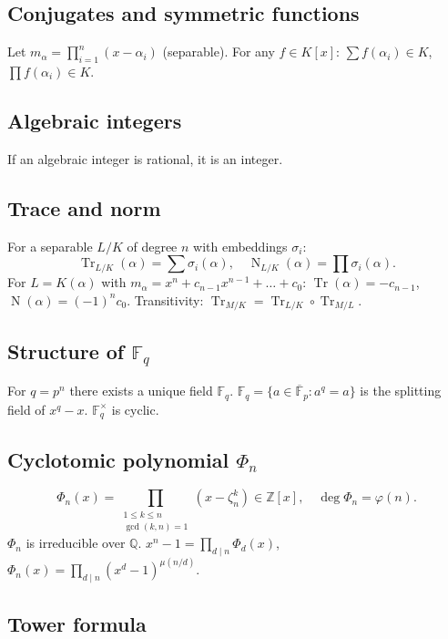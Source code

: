 \subsection{Conjugates and symmetric functions}
\label{subsec:conjugates}

Let $m_\alpha=\prod_{i=1}^n(x-\alpha_i)$ (separable). For any $f\in K[x]$: $\sum f(\alpha_i)\in K$, $\prod f(\alpha_i)\in K$.

\subsection{Algebraic integers}
\label{subsec:algebraic-integers}

If an algebraic integer is rational, it is an integer.

\subsection{Trace and norm}
\label{subsec:trace-norm}

For a separable $L/K$ of degree $n$ with embeddings $\sigma_i$:
$$\operatorname{Tr}_{L/K}(\alpha)=\sum\sigma_i(\alpha),\quad \operatorname{N}_{L/K}(\alpha)=\prod\sigma_i(\alpha).$$
For $L=K(\alpha)$ with $m_\alpha=x^n+c_{n-1}x^{n-1}+\dots+c_0$: $\operatorname{Tr}(\alpha)=-c_{n-1}$, $\operatorname{N}(\alpha)=(-1)^n c_0$.
Transitivity: $\operatorname{Tr}_{M/K}=\operatorname{Tr}_{L/K}\circ\operatorname{Tr}_{M/L}$.

\subsection{Structure of $\mathbb{F}_q$}
\label{subsec:structure-fq}

For $q=p^n$ there exists a unique field $\mathbb{F}_q$. $\mathbb{F}_q=\{a\in\overline{\mathbb{F}}_p:a^q=a\}$ is the splitting field of $x^q-x$. $\mathbb{F}_q^\times$ is cyclic.

\subsection{Cyclotomic polynomial $\Phi_n$}
\label{subsec:cyclotomic}

$$\Phi_n(x)=\prod_{\substack{1\le k\le n\\\gcd(k,n)=1}}(x-\zeta_n^k)\in\mathbb{Z}[x],\quad\deg\Phi_n=\varphi(n).$$
$\Phi_n$ is irreducible over $\mathbb{Q}$. $x^n-1=\prod_{d\mid n}\Phi_d(x)$, $\Phi_n(x)=\prod_{d\mid n}(x^d-1)^{\mu(n/d)}$.

\subsection{Tower formula}
\label{subsec:tower-formula}

